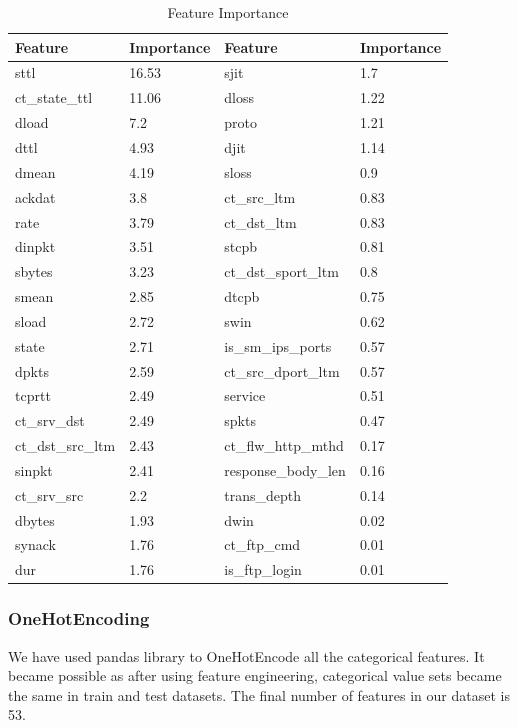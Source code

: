 \documentclass[14pt, conference]{IEEEtran}
\begin{document}
\begin{table}
\normalsize
\centering
\caption{Feature Importance}
\label{featureImportance}
\renewcommand{\arraystretch}{1.2}
\begin{tabular}{|C{2.1cm}|C{1.1cm}|C{2.5cm}|C{1.1cm}|}
\hline
\textbf{Feature} & \textbf{Importance} & \textbf{Feature} & \textbf{Importance}\\ \hline

sttl & 16.53& sjit & 1.7  \\ \hline
ct\_state\_ttl & 11.06& dloss & 1.22  \\ \hline
dload & 7.2& proto & 1.21  \\ \hline
dttl & 4.93& djit & 1.14  \\ \hline
dmean & 4.19& sloss & 0.9  \\ \hline
ackdat & 3.8& ct\_src\_ltm & 0.83  \\ \hline
rate & 3.79& ct\_dst\_ltm & 0.83  \\ \hline
dinpkt & 3.51& stcpb & 0.81  \\ \hline
sbytes & 3.23& ct\_dst\_sport\_ltm & 0.8  \\ \hline
smean & 2.85& dtcpb & 0.75  \\ \hline
sload & 2.72& swin & 0.62  \\ \hline
state & 2.71& is\_sm\_ips\_ports & 0.57  \\ \hline
dpkts & 2.59& ct\_src\_dport\_ltm & 0.57  \\ \hline
tcprtt & 2.49& service & 0.51  \\ \hline
ct\_srv\_dst & 2.49& spkts & 0.47  \\ \hline
ct\_dst\_src\_ltm & 2.43& ct\_flw\_http\_mthd & 0.17  \\ \hline
sinpkt & 2.41& response\_body\_len & 0.16  \\ \hline
ct\_srv\_src & 2.2& trans\_depth & 0.14  \\ \hline
dbytes & 1.93& dwin & 0.02  \\ \hline
synack & 1.76& ct\_ftp\_cmd & 0.01  \\ \hline
dur & 1.76& is\_ftp\_login & 0.01  \\ \hline

\end{tabular}
\end{table}


\subsubsection{OneHotEncoding}
We have used pandas library to OneHotEncode all the categorical features. It became possible as after using feature engineering, categorical value sets became the same in train and test datasets. The final number of features in our dataset is 53.
\end{document}
